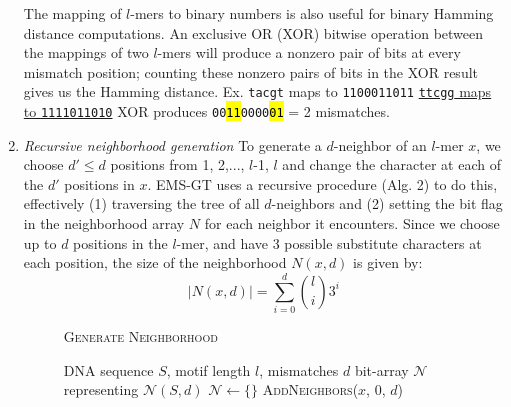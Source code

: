 \documentclass[conference]{IEEEtran}
\begin{document}
\begin{enumerate}[label={\em \arabic*.}]
			The mapping of $l$-mers to binary numbers  is also useful for binary Hamming distance computations. An exclusive OR (XOR) bitwise operation between the mappings of two $l$-mers will produce a nonzero pair of bits at every mismatch position; counting these nonzero pairs of bits in the XOR result gives us the Hamming distance.\newline \newline
			{\small Ex.	\texttt{tacgt} maps to \texttt{1100011011} \newline
				\vspace*{2pt}\hspace*{12pt} \underline{\texttt{ttcgg} maps to \texttt{1111011010}} \newline
				\hspace*{17pt}	XOR produces \texttt{00\hl{11}0000\hl{01}} = 2 mismatches.}
			\bigskip
		\item{\em Recursive neighborhood generation}\newline
			To generate a $d$-neighbor of an $l$-mer $x$, we choose $d' \leq d$ positions from 1, 2,..., $l$-1, $l$ and change the character at each of the $d'$ positions in $x$. EMS-GT uses a recursive procedure (Alg. 2) to do this, effectively (1) traversing the tree of all $d$-neighbors and (2) setting the bit flag in the neighborhood array $N$ for each neighbor it encounters. Since we choose up to $d$ positions in the $l$-mer, and have 3 possible substitute characters at each position, the size of the neighborhood $N(x,d)$ is given by: %
			\begin{equation}
				|N(x,d)| = \sum_{i=0}^d \binom{l}{i} 3^{i}
			\end{equation}
			\begin{figure}[b]
			\noindent \hspace*{6pt}{\bf Algorithm 2} \textsc{Generate Neighborhood}
			\begin{algorithmic}[1]
				\label{alg:recursive-nbr-gen}
				\Require DNA sequence $S$, motif length $l$, mismatches $d$
				\Ensure bit-array $\mathcal{N}$ representing $\mathcal{N}(S,d)$ \vspace*{6pt}
				\State $\mathcal{N}\leftarrow \{\}$
				\State \textsc{AddNeighbors}($x$, 0, $d$) \hspace*{9pt}
				\EndFor
				\State {}

\end{algorithmic}
\end{figure}
\end{enumerate}
\end{document}
